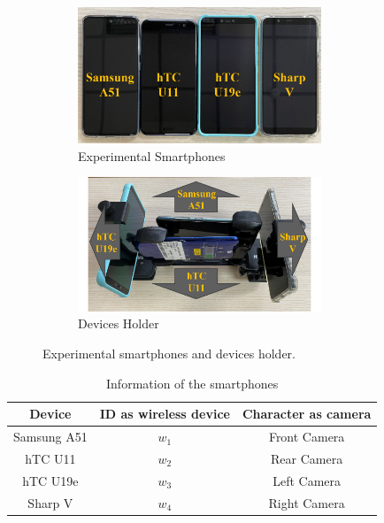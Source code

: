 \documentclass[a4paper,12pt]{report}
\begin{document}
\begin{figure}[tbph]%
    \begin{subfigure}{1\linewidth}
    \centering
        \includegraphics[width=0.8\textwidth]{images/4_1_Experimental_Smartphones.png}
        \caption{Experimental Smartphones}
        \label{figure:4_1_Experimental_Smartphones}
    \end{subfigure}
    \begin{subfigure}{1\linewidth}
    \centering
        \includegraphics[width=0.8\textwidth]{images/4_1_Devices_Holder.png}
        \caption{Devices Holder}
        \label{figure:4_1_Devices_Holder}
    \end{subfigure}
\caption{Experimental smartphones and devices holder.}
\label{figure:4_1_Experimental_Devices}
\end{figure}

\begin{table}
    \begin{center}
    \caption{Information of the smartphones}
    \label{table:4_1_Smartphone_Informations}
        \begin{tabular}{|c|c|c|}
            \hline
                Device & ID as wireless device & Character as camera \\
            \hline
                Samsung A51 & $w_1$ & Front Camera \\
            \hline
                hTC U11     & $w_2$ & Rear Camera \\
            \hline
                hTC U19e    & $w_3$ & Left Camera \\
            \hline
                Sharp V     & $w_4$ & Right Camera \\
            \hline
        \end{tabular}
    \end{center}
\end{table}
\end{document}
